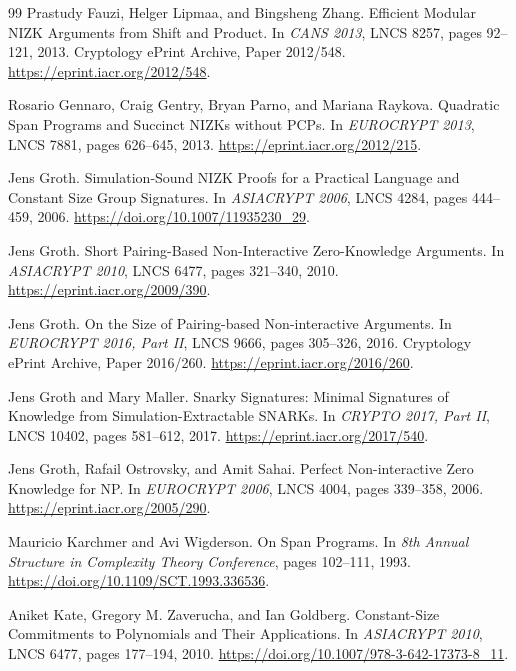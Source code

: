 \documentclass[11pt]{article}
\theoremstyle{definition}
\begin{document}
\begin{thebibliography}{99}
Prastudy Fauzi, Helger Lipmaa, and Bingsheng Zhang.
\newblock Efficient Modular NIZK Arguments from Shift and Product.
\newblock In \emph{CANS 2013}, LNCS 8257, pages 92--121, 2013.
\newblock Cryptology ePrint Archive, Paper 2012/548.
\newblock \url{https://eprint.iacr.org/2012/548}.

Rosario Gennaro, Craig Gentry, Bryan Parno, and Mariana Raykova.
\newblock Quadratic Span Programs and Succinct NIZKs without PCPs.
\newblock In \emph{EUROCRYPT 2013}, LNCS 7881, pages 626--645, 2013.
\newblock \url{https://eprint.iacr.org/2012/215}.

Jens Groth.
\newblock Simulation-Sound NIZK Proofs for a Practical Language and Constant
Size Group Signatures.
\newblock In \emph{ASIACRYPT 2006}, LNCS 4284, pages 444--459, 2006.
\newblock \url{https://doi.org/10.1007/11935230_29}.

Jens Groth.
\newblock Short Pairing-Based Non-Interactive Zero-Knowledge Arguments.
\newblock In \emph{ASIACRYPT 2010}, LNCS 6477, pages 321--340, 2010.
\newblock \url{https://eprint.iacr.org/2009/390}.

Jens Groth.
\newblock On the Size of Pairing-based Non-interactive Arguments.
\newblock In \emph{EUROCRYPT 2016, Part II}, LNCS 9666, pages 305--326,
2016.
\newblock Cryptology ePrint Archive, Paper 2016/260.
\newblock \url{https://eprint.iacr.org/2016/260}.

Jens Groth and Mary Maller.
\newblock Snarky Signatures: Minimal Signatures of Knowledge from
Simulation-Extractable SNARKs.
\newblock In \emph{CRYPTO 2017, Part II}, LNCS 10402, pages 581--612, 2017.
\newblock \url{https://eprint.iacr.org/2017/540}.

Jens Groth, Rafail Ostrovsky, and Amit Sahai.
\newblock Perfect Non-interactive Zero Knowledge for NP.
\newblock In \emph{EUROCRYPT 2006}, LNCS 4004, pages 339--358, 2006.
\newblock \url{https://eprint.iacr.org/2005/290}.

Mauricio Karchmer and Avi Wigderson.
\newblock On Span Programs.
\newblock In \emph{8th Annual Structure in Complexity Theory Conference},
pages 102--111, 1993.
\newblock \url{https://doi.org/10.1109/SCT.1993.336536}.

Aniket Kate, Gregory M. Zaverucha, and Ian Goldberg.
\newblock Constant-Size Commitments to Polynomials and Their Applications.
\newblock In \emph{ASIACRYPT 2010}, LNCS 6477, pages 177--194, 2010.
\newblock \url{https://doi.org/10.1007/978-3-642-17373-8_11}.


\end{thebibliography}
\end{document}
